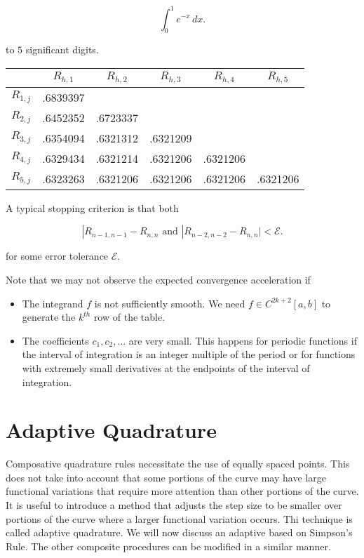 \documentclass[12pt]{article}
\newcommand{\bigEps}{\mathcal{E}}
\begin{document}
\[
  \int_{0}^{1} e^{-x} \, dx
.\]

to $5$ significant digits.

\begin{tabular}{c|ccccc}
      & $R_{h,1}$ & $R_{h,2}$ & $R_{h,3}$ & $R_{h,4}$ & $R_{h,5}$ \\
\hline
  $R_{1,j}$ & .6839397 &          &          &        &            \\
  $R_{2,j}$ & .6452352 & .6723337 &          &        &            \\
  $R_{3,j}$ & .6354094 & .6321312 & .6321209 &        &            \\
  $R_{4,j}$ & .6329434 & .6321214 & .6321206 & .6321206 &          \\
  $R_{5,j}$ & .6323263 & .6321206 & .6321206 & .6321206 & .6321206 \\
\end{tabular}

A typical stopping criterion is that both

\[
  |R_{n-1, n-1} - R_{n,n} \text{ and } |R_{n-2,n-2} - R_{n,n}| < \bigEps
.\]

for some error tolerance $\bigEps$.

Note that we may not observe the expected convergence acceleration if

\begin{itemize}
  \item The integrand $f$ is not sufficiently smooth. We need $f\in
    C^{2k+2}[a,b]$ to generate the $k^{th}$ row of the table.
  \item The coefficients $c_1, c_2, \dots$ are very small. This happens for
    periodic functions if the interval of integration is an integer multiple of
    the period or for functions with extremely small derivatives at the
    endpoints of the interval of integration.
\end{itemize}

\section{Adaptive Quadrature}

Composative quadrature rules necessitate the use of equally spaced points. This
does not take into account that some portions of the curve may have large
functional variations that require more attention than other portions of the
curve. It is useful to introduce a method that adjusts the step size to be
smaller over portions of the curve where a larger functional variation occurs.
Thi technique is called adaptive quadrature. We will now discuss an adaptive
based on Simpson's Rule. The other composite procedures can be modified in a
similar manner.
\end{document}

